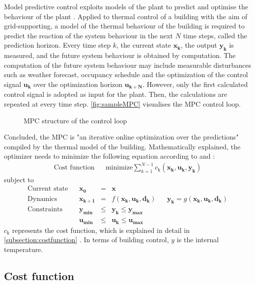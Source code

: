 Model predictive control exploits models of the plant to predict and optimise the behaviour of the plant \cite{Grune.2017}.
Applied to thermal control of a building with the aim of grid-supporting, a model of the thermal behaviour of the building is required to predict the reaction of the system behaviour in the next $N$ time steps, called the prediction horizon. Every time step $k$, the current state $\mathbf{x_k}$, the output $\mathbf{y_k}$ is measured, and the future system behaviour is obtained by computation. The computation of the future system behaviour may include measurable disturbances such as weather forecast, occupancy schedule and the optimization of the control signal $\mathbf{u_k}$ over the optimization horizon $\mathbf{u_{k+N}}$. However, only the first calculated control signal is adopted as input for the plant.
Then, the calculations are repeated at every time step. \autoref{fig:sampleMPC} visualises the MPC control loop.
 \begin{figure}[h]
    \centering
   \def\svgwidth{320pt}
    
    \caption{MPC structure of the control loop}
    \label{fig:sampleMPC}
    \end{figure}
\newline
Concluded, the MPC is "an iterative online optimization over the predictions"
\cite{Grune.2017} 
compiled by the thermal model of the building. Mathematically explained, the optimizer needs to minimize the following equation according to
\cite{Kouvaritakis.2018}
and
\cite{Oldewurtel.2012}:
\begin{align}
\label{eq:costfunc}
\textrm{Cost function} && \text{minimize} \sum_{k=1}^{N-1} c_\text{k}(\mathbf{x_k,u_k,y_k})
\end{align}
subject to 
\begin{align*}
\textrm{Current state} && \mathbf{x_0} &=& \mathbf{x} \\	
\textrm{Dynamics} && \mathbf{x_{k+1}}&=& f(\mathbf{x_k,u_k,d_k})		&&	\mathbf{y_k} = g(\mathbf{x_k,u_k,d_k})\\				
\textrm{Constraints} && \mathbf{y_{min}}&\leq& \mathbf{y_k} \leq \mathbf{y_{max}}\\		
\textrm{} && \mathbf{u_{min}}&\leq& \mathbf{u_k} \leq \mathbf{u_{max}}	
\end{align*}
$c_\text{k}$ represents the cost function, which is explained in detail in \autoref{subsection:costfunction}
. In terms of building control, $y$ is the internal temperature.

\subsection{Cost function}
\label{subsection:costfunction}

